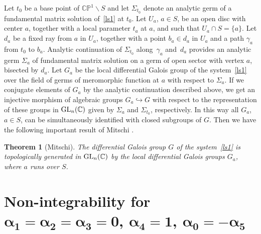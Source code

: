 \documentclass[pdftex]{sigma}
\numberwithin{equation}{section}
\newtheorem{Theorem}{Theorem}[section]
\begin{document}
 Let $t_0$ be a base point of $\mathbb{C}\mathbb{P}^1 \backslash S$ and
 let $\Sigma_{t_0}$ denote an analytic germ of a fundamental matrix solution of~\eqref{ls1} at $t_0$. Let $U_a$, $a\in S$, be an open disc with center $a$,
 together with a local parameter $t_a$ at $a$, and such that $U_a \cap S=\{a\}$. Let $d_a$ be a fixed ray from $a$ in $U_a$, together with a point
$b_a\in d_a$ in $U_a$ and a path $\gamma_a$ from $t_0$ to $b_a$. Analytic continuation of $\Sigma_{t_0}$ along~$\gamma_a$ and~$d_a$ provides
an analytic germ $\Sigma_a$ of fundamental matrix solution on a germ of open sector with vertex $a$, bisected by $d_a$. Let $G_a$ be the local differential Galois group
of the system~\eqref{ls1} over the field of germs of meromorphic function at $a$ with respect to $\Sigma_a$. If we conjugate elements of $G_a$ by the analytic continuation
described above, we get an injective morphism of algebraic groups $G_a \hookrightarrow G$ with respect to the representation of these groups in
 ${\rm GL}_n(\mathbb{C})$ given by $\Sigma_a$ and $\Sigma_{t_0}$, respectively. In this way all $G_a$, $a\in S$, can be simultaneously identified with closed subgroups of $G$.
 Then we have the following important result of Mitschi \cite[Proposition 1.3]{Mi}.

 \begin{Theorem}[Mitschi]\label{Mi}
 The differential Galois group $G$ of the system~\eqref{ls1} is topologically generated in ${\rm GL}_n(\mathbb{C})$
 by the local differential Galois groups $G_a$, where $a$ runs over $S$.
 \end{Theorem}

 \section[Non-integrability for alpha\_1=alpha\_2=alpha\_3=0, alpha\_4=1, alpha\_0=-alpha\_5]{Non-integrability for $\boldsymbol{\alpha_1=\alpha_2=\alpha_3=0}$, $\boldsymbol{\alpha_4=1}$, $\boldsymbol{\alpha_0=-\alpha_5}$}\label{section3}
\end{document}
